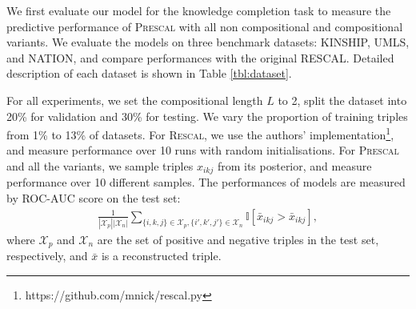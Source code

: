 

We first evaluate our model for the knowledge completion task
to measure the predictive performance of \textsc{Prescal} with all non compositional and compositional variants.
We evaluate the models on three benchmark datasets: KINSHIP, UMLS, and NATION, and compare  performances with the original \textsc{RESCAL}. 
Detailed description of each
dataset is shown in Table \ref{tbl:dataset}.

For all experiments, we set the compositional length $L$ to 2, split the dataset into 20\% for validation and 30\% for testing. We vary the proportion of training triples
from 1\% to 13\% of datasets. For \textsc{Rescal}, we use the authors' implementation\footnote{https://github.com/mnick/rescal.py}, and measure performance over 10 runs with random initialisations. For \textsc{Prescal} and all the variants, we sample triples $x_{ikj}$ from its posterior, and measure performance over 10 different samples.
The performances of models are measured by ROC-AUC score on the test set:
\begin{align}
\frac{1}{|\mathcal{X}_p|  |\mathcal{X}_n|} \sum_{\{i,k,j\} \in \mathcal{X}_p, \{i',k',j'\} \in \mathcal{X}_n} \mathbb{I}[\bar{x}_{ikj} > \bar{x}_{ikj}],
\end{align}
where $\mathcal{X}_p$ and $\mathcal{X}_n$ are the set of positive and negative triples in the test set, respectively, and $\bar{x}$ is a reconstructed triple.

